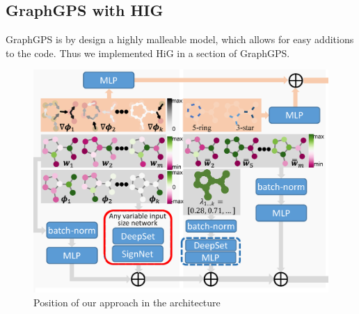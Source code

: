 \subsection{GraphGPS with HIG}
GraphGPS is by design a highly malleable model, which allows for easy additions to the code. Thus we implemented HiG in a section of GraphGPS.

\begin{figure}[ht]
    \centering
    \includegraphics[scale=0.2]{tex/res/gps_hig_position.png}
    \caption{Position of our approach in the architecture}
    \label{fig:gps-hig-position}
\end{figure}

